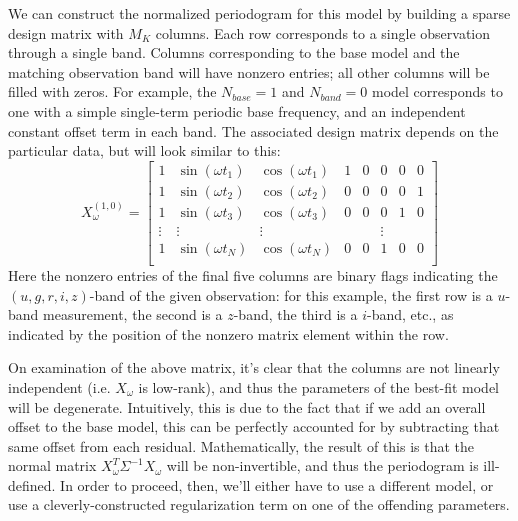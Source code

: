 \documentclass{emulateapj}
\begin{document}
We can construct the normalized periodogram for this model by building a sparse design matrix with $M_K$ columns. Each row corresponds to a single observation through a single band. Columns corresponding to the base model and the matching observation band will have nonzero entries; all other columns will be filled with zeros. For example, the $N_{base}=1$ and $N_{band}=0$ model corresponds to one with a simple single-term periodic base frequency, and an independent constant offset term in each band. The associated design matrix depends on the particular data, but will look similar to this:
\begin{equation}
X_\omega^{(1,0)} = \left[
\begin{array}{cccccccc}
1 & \sin(\omega t_1) & \cos(\omega t_1) & 1 & 0 & 0 & 0 & 0\\
1 & \sin(\omega t_2) & \cos(\omega t_2) & 0 & 0 & 0 & 0 & 1\\
1 & \sin(\omega t_3) & \cos(\omega t_3) & 0 & 0 & 0 & 1 & 0\\
\vdots & \vdots & \vdots & & & \vdots & &\\
1 & \sin(\omega t_N) & \cos(\omega t_N) & 0 & 0 & 1 & 0 & 0\\
\end{array}
\right]
\end{equation}
Here the nonzero entries of the final five columns are binary flags indicating the $(u, g, r, i, z)$-band of the given observation: for this example, the first row is a $u$-band measurement, the second is a $z$-band, the third is a $i$-band, etc., as indicated by the position of the nonzero matrix element within the row.

On examination of the above matrix, it's clear that the columns are not linearly independent (i.e. $X_\omega$ is low-rank), and thus the parameters of the best-fit model will be degenerate. Intuitively, this is due to the fact that if we add an overall offset to the base model, this can be perfectly accounted for by subtracting that same offset from each residual. Mathematically, the result of this is that the normal matrix $X_\omega^T\Sigma^{-1}X_\omega$ will be non-invertible, and thus the periodogram is ill-defined. In order to proceed, then, we'll either have to use a different model, or use a cleverly-constructed regularization term on one of the offending parameters.
\end{document}
